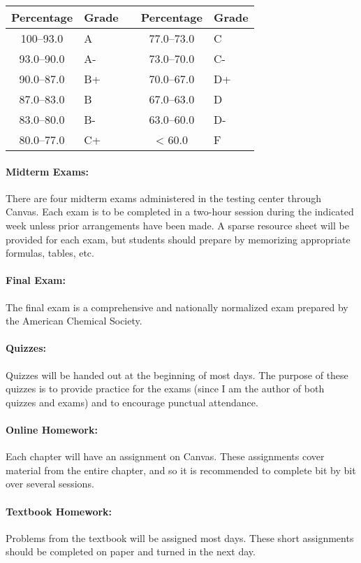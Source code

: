 \documentclass[12pt, letterpaper]{article}
\begin{document}
\begin{tabular}{cl|c|cl}
	Percentage & Grade &  & Percentage & Grade \\ \midrule
	100--93.0  & A     &  & 77.0--73.0 & C     \\
	93.0--90.0 & A-    &  & 73.0--70.0 & C-    \\
	90.0--87.0 & B+    &  & 70.0--67.0 & D+    \\
	87.0--83.0 & B     &  & 67.0--63.0 & D     \\
	83.0--80.0 & B-    &  & 63.0--60.0 & D-    \\
	80.0--77.0 & C+    &  & < 60.0     & F
\end{tabular}

\paragraph{Midterm Exams:}
There are four midterm exams administered in the testing center through Canvas. Each exam is to be completed in a two-hour session during the indicated week unless prior arrangements have been made. A sparse resource sheet will be provided for each exam, but students should prepare by memorizing appropriate formulas, tables, etc.

\paragraph{Final Exam:}
The final exam is a comprehensive and nationally normalized exam prepared by the American Chemical Society.

\paragraph{Quizzes:}
Quizzes will be handed out at the beginning of most days. The purpose of these quizzes is to provide practice for the exams (since I am the author of both quizzes and exams) and to encourage punctual attendance.

\paragraph{Online Homework:}
Each chapter will have an assignment on Canvas. These assignments cover material from the entire chapter, and so it is recommended to complete bit by bit over several sessions.

\paragraph{Textbook Homework:}
Problems from the textbook will be assigned most days. These short assignments should be completed on paper and turned in the next day.
\end{document}
